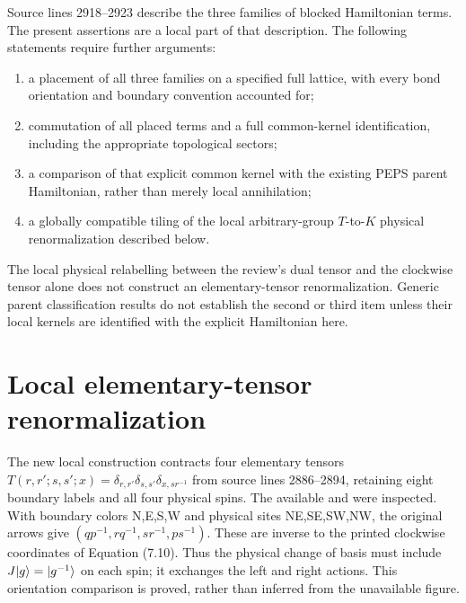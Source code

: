 \documentclass{article}
\begin{document}
Source lines 2918--2923 describe the three families of blocked Hamiltonian
terms. The present assertions are a local part of that description. The
following statements require further arguments:
\begin{enumerate}
    \item a placement of all three families on a specified full lattice,
          with every bond orientation and boundary convention accounted for;
    \item commutation of all placed terms and a full common-kernel
          identification, including the appropriate topological sectors;
    \item a comparison of that explicit common kernel with the existing
          PEPS parent Hamiltonian, rather than merely local annihilation;
    \item a globally compatible tiling of the local arbitrary-group
          $T$-to-$K$ physical renormalization described below.
\end{enumerate}
The local physical relabelling between the review's dual tensor and the
clockwise tensor alone does not construct an elementary-tensor renormalization. Generic parent
classification results do not establish the second or third item unless
their local kernels are identified with the explicit Hamiltonian here.

\section{Local elementary-tensor renormalization}
The new local construction contracts four elementary tensors
$T(r,r';s,s';x)=\delta_{r,r'}\delta_{s,s'}\delta_{x,sr^{-1}}$
from source lines 2886--2894, retaining eight boundary labels and all four
physical spins. The available  and
 were inspected. With boundary colors N,E,S,W and
physical sites NE,SE,SW,NW, the original arrows give
$(qp^{-1},rq^{-1},sr^{-1},ps^{-1})$. These are inverse to the printed
clockwise coordinates of Equation (7.10). Thus the physical change of
basis must include $J|g\rangle=|g^{-1}\rangle$ on each spin; it exchanges the
left and right actions. This orientation comparison is proved, rather
than inferred from the unavailable  figure.
\end{document}
